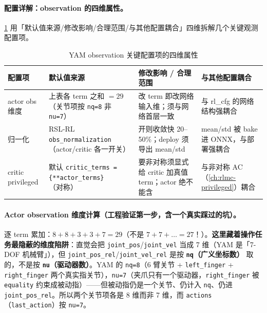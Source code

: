 \paragraph{配置详解：observation 的四维属性。}\cref{tab:rlmc-manip-obscfg} 用「默认值来源/修改影响/合理范围/与其他配置耦合」四维拆解几个关键观测配置项。

\begin{table}[ht]
\centering
\small
\caption{YAM observation 关键配置项的四维属性}
\label{tab:rlmc-manip-obscfg}
\begin{tabular}{@{}p{2.4cm}p{2.6cm}p{2.8cm}p{3.2cm}@{}}
\toprule
配置项 & 默认值来源 & 修改影响 / 合理范围 & 与其他配置耦合 \\
\midrule
actor obs 维度 & 上表各 term 之和 $=29$（关节项按 \texttt{nq=8} 非 \texttt{nu=7}） & 改 term 即改网络输入维；须与网络首层一致 & 与 rl\_cfg 的网络结构强耦合 \\
归一化 & RSL-RL \verb|obs_normalization|（actor/critic 各一开关） & 开则收敛快 20--50\%；deploy 须导出 mean/std & mean/std 被 bake 进 ONNX，与部署强耦合 \\
critic privileged & 默认 \texttt{critic\_terms = \{**actor\_terms\}}（对称） & 要非对称须显式给 critic 加真值 term；actor 绝不能含 & 与非对称 AC（\cref{ch:rlmc-privileged}）耦合 \\
\bottomrule
\end{tabular}
\end{table}

\paragraph{Actor observation 维度计算（工程验证第一步，含一个真实踩过的坑）。}逐 term 累加：$8+8+3+3+7=29$（不是 $7+7+\dots=27$！）。\textbf{这里藏着操作任务最隐蔽的维度陷阱}：直觉会把 \verb|joint_pos|/\verb|joint_vel| 当成 7 维（YAM 是「7-DOF 机械臂」），但 \verb|joint_pos_rel|/\verb|joint_vel_rel| 是按 \textbf{\texttt{nq}（广义坐标数）} 取的，不是按 \textbf{\texttt{nu}（驱动器数）}。YAM 的 \verb|nq=8|（6 臂关节 + \verb|left_finger| + \verb|right_finger| 两个真实指关节），\verb|nu=7|（夹爪只有一个驱动器，\verb|right_finger| 被 \verb|equality| 约束成被动指）——但被动指仍是一个关节、仍计入 \verb|nq|、仍进 \verb|joint_pos_rel|。所以两个关节项各是 8 维而非 7 维，而 \verb|actions|（\verb|last_action|）按 \verb|nu=7|。


